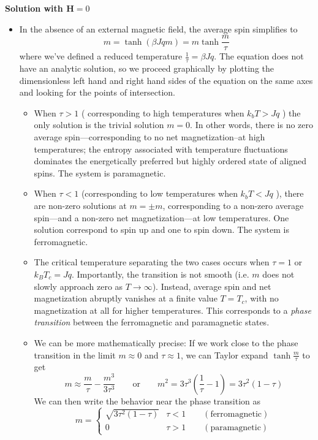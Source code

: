 \documentclass[11pt, a4paper]{article}
\newcommand{\eqtext}[1]{\qquad \text{#1} \qquad}
\begin{document}
\textbf{Solution with $ \bm{H} = 0 $}
\begin{itemize}	
	\item In the absence of an external magnetic field, the average spin simplifies to
	\begin{equation*}
		m = \tanh(\beta J q m) = m \tanh \frac{m}{\tau}
	\end{equation*}
	where we've defined a reduced temperature $ \frac{1}{\tau} = \beta Jq  $. The equation does not have an analytic solution, so we proceed graphically by plotting the dimensionless left hand and right hand sides of the equation on the same axes and looking for the points of intersection.  
	\begin{itemize}
		\item When $ \tau > 1 $ ( corresponding to high temperatures when $ k_{b}T > J q $ ) the only solution is the trivial solution $ m = 0 $. In other words, there is no zero average spin---corresponding to no net magnetization--at high temperatures; the entropy associated with temperature fluctuations dominates the energetically preferred but highly ordered state of aligned spins. The system is paramagnetic.
		
		\item When $ \tau < 1 $ (corresponding to low temperatures when $ k_{b}T < J q $ ), there are non-zero solutions at $ m = \pm m $, corresponding to a non-zero average spin---and a non-zero net magnetization---at low temperatures. One solution correspond to spin up and one to spin down. The system is ferromagnetic.
		
		\item The critical temperature separating the two cases occurs when $ \tau = 1 $ or $ k_{B}T_{c} = Jq $. Importantly, the transition is not smooth (i.e. $ m $ does not slowly approach zero as $ T \to \infty $). Instead, average spin and net magnetization abruptly vanishes at a finite value $ T = T_{c} $, with no magnetization at all for higher temperatures. This corresponds to a \textit{phase transition} between the ferromagnetic and paramagnetic states. 
		
		\item We can be more mathematically precise: If we work close to the phase transition in the limit $ m \approx 0 $ and $ \tau \approx 1 $, we can Taylor expand $ \tanh \frac{m}{\tau} $ to get
		\begin{equation*}
			m \approx \frac{m}{\tau} - \frac{m^{3}}{3\tau^{3}} \eqtext{or} m^{2} = 3 \tau^{3}\left(\frac{1}{\tau} - 1\right) = 3\tau^{2}(1 - \tau)
		\end{equation*}
		We can then write the behavior near the phase transition as
		\begin{equation*}
			m = 
			\begin{cases}
				\sqrt{3\tau^{2}(1 - \tau)} & \tau < 1 \qquad (\text{ferromagnetic})\\
				0	&  \tau > 1	 \qquad (\text{paramagnetic})
			\end{cases}
		\end{equation*}
	\end{itemize}
	
\end{itemize}	
\end{document}
